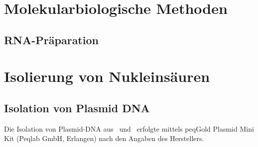 \section{Molekularbiologische Methoden}
\subsection{RNA-Präparation}
\section{Isolierung von Nukleinsäuren}
\subsection{Isolation von Plasmid DNA}
Die Isolation von Plasmid-DNA aus \Ecoli\ und \Atumefaciens\ erfolgte mittels peqGold Plasmid Mini Kit (Peqlab GmbH, Erlangen) nach den Angaben des Herstellers. 
